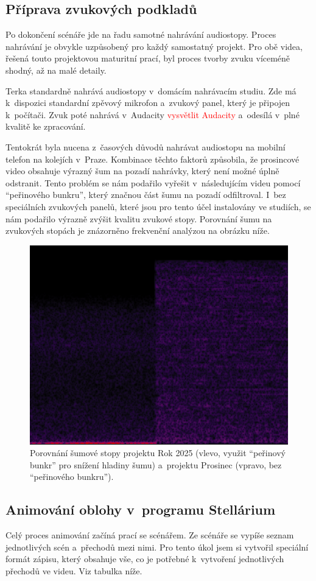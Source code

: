 \documentclass[12pt,a4paper,titlepage]{article}
\newcommand{\todo}[1]{\textcolor{red}{#1}}
\begin{document}
\subsection{Příprava zvukových podkladů}\label{makingof:audio-prep}
Po dokončení scénáře jde na řadu samotné nahrávání audiostopy. Proces nahrávání je obvykle uzpůsobený pro každý samostatný projekt. Pro obě videa, řešená touto projektovou maturitní prací, byl proces tvorby zvuku víceméně shodný, až na malé detaily. 

Terka standardně nahrává audiostopy v~domácím nahrávacím studiu. Zde má k~dispozici standardní zpěvový mikrofon a~zvukový panel, který je připojen k~počítači. Zvuk poté nahrává v~Audacity \todo{vysvětlit Audacity} a~odesílá v~plné kvalitě ke zpracování. 

Tentokrát byla nucena z~časových důvodů nahrávat audiostopu na mobilní telefon na kolejích v~Praze. Kombinace těchto faktorů způsobila, že prosincové video obsahuje výrazný šum na pozadí nahrávky, který není možné úplně odstranit. Tento problém se nám podařilo vyřešit v~následujícím videu pomocí \enquote{peřinového bunkru}, který značnou část šumu na pozadí odfiltroval. I~bez speciálních zvukových panelů, které jsou pro tento účel instalovány ve studiích, se nám podařilo výrazně zvýšit kvalitu zvukové stopy. Porovnání šumu na zvukových stopách je znázorněno frekvenční analýzou na obrázku níže.
\begin{figure}[H]
	\centering
	\includegraphics[width=.8\textwidth]{fourier.png}
	\caption{Porovnání šumové stopy projektu Rok 2025 (vlevo, využit \enquote{peřinový bunkr} pro snížení hladiny šumu) a~projektu Prosinec (vpravo, bez \enquote{peřinového bunkru}).}\label{img:fourier}
\end{figure}
\subsection{Animování oblohy v~programu Stellárium}\label{makingof:stellarium}
Celý proces animování začíná prací se scénářem. Ze scénáře se vypíše seznam jednotlivých scén a~přechodů mezi nimi. Pro tento úkol jsem si vytvořil speciální formát zápisu, který obsahuje vše, co je potřebné k~vytvoření jednotlivých přechodů ve videu. Viz tabulka níže.
\end{document}
